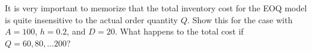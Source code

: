 \begin{exercise}
  It is very important to memorize that the total inventory cost for
  the EOQ model is quite insensitive to the actual order quantity
  $Q$. Show this for the case with $A=100$, $h=0.2$, and $D=20$. What
  happens to the total cost if $Q=60, 80, \ldots 200$?
  \begin{comment}
From the EOQ formula
\begin{itemize}
\item $Q^{*} \approx 141.42$ units
\item $f(Q^{*}) \approx \mathdollar 48.28$
\end{itemize}

\begin{center}
\footnotesize
\begin{tabular}{rrrrr}
\toprule
$Q$     & $AD/Q$  &  $hQ/2$  & $f(Q)$ \\
\midrule
    60    & 33.33 &  6.00  & 59.33 \\
    80    & 25.00 &  8.00  & 53.00 \\
    100   & 20.00 &  10.00 & 50.00 \\
    120   & 16.67 &  12.00 & 48.67 \\
    140   & 14.29 &  14.00 & 48.29 \\
    160   & 12.50 &  16.00 & 48.50 \\
    180   & 11.11 &  18.00 & 49.11 \\
    200   & 10.00 &  20.00 & 50.00 \\
\bottomrule
\end{tabular}
\end{center}
  \end{comment}
\end{exercise}


